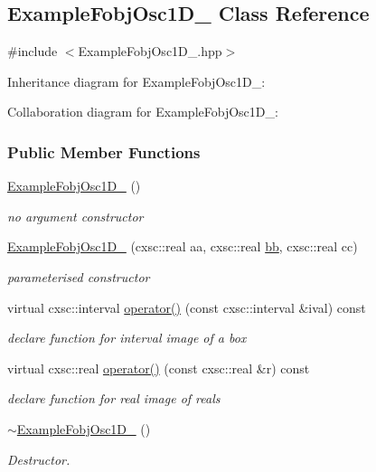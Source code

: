 \hypertarget{classExampleFobjOsc1D__1}{\subsection{\-Example\-Fobj\-Osc1\-D\-\_ \-Class \-Reference}
\label{classExampleFobjOsc1D__1}
}


{\ttfamily \#include $<$\-Example\-Fobj\-Osc1\-D\-\_.\-hpp$>$}



\-Inheritance diagram for \-Example\-Fobj\-Osc1\-D\-\_\-:


\-Collaboration diagram for \-Example\-Fobj\-Osc1\-D\-\_\-:
\subsubsection*{\-Public \-Member \-Functions}
\begin{DoxyCompactItemize}
\item 
\hyperlink{classExampleFobjOsc1D__1_a8fcf51883e357486dea42202414591ff}{\-Example\-Fobj\-Osc1\-D\-\_} ()
\begin{DoxyCompactList}\small\item\em no argument constructor \end{DoxyCompactList}\item 
\hyperlink{classExampleFobjOsc1D__1_ac10ec749ad36a89c5ecc772298cab65c}{\-Example\-Fobj\-Osc1\-D\-\_} (cxsc\-::real aa, cxsc\-::real \hyperlink{FShiryaev1D_8hpp_afe4fb267f5fd876bc5f069b0a76054e4}{bb}, cxsc\-::real cc)
\begin{DoxyCompactList}\small\item\em parameterised constructor \end{DoxyCompactList}\item 
virtual cxsc\-::interval \hyperlink{classExampleFobjOsc1D__1_a8108e47fa674cb0730e2ecfe7c41914e}{operator()} (const cxsc\-::interval \&ival) const 
\begin{DoxyCompactList}\small\item\em declare function for interval image of a box \end{DoxyCompactList}\item 
virtual cxsc\-::real \hyperlink{classExampleFobjOsc1D__1_a8a5ec95bbb50d9989cdfa4feda45f262}{operator()} (const cxsc\-::real \&r) const 
\begin{DoxyCompactList}\small\item\em declare function for real image of reals \end{DoxyCompactList}\item 
\hyperlink{classExampleFobjOsc1D__1_a26dee38bd5cbe4155622c2a901ebefc4}{$\sim$\-Example\-Fobj\-Osc1\-D\-\_} ()
\begin{DoxyCompactList}\small\item\em \-Destructor. \end{DoxyCompactList}\end{DoxyCompactItemize}
